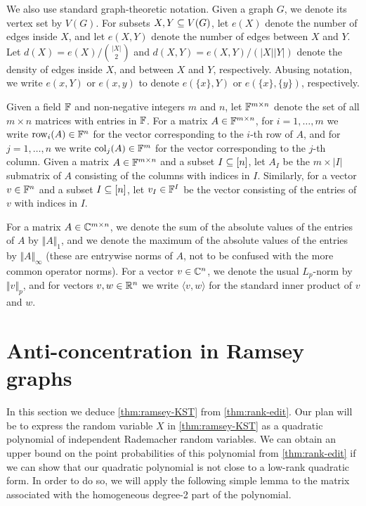 \documentclass{daj}
\theoremstyle{plain}
\theoremstyle{plain}
\theoremstyle{plain}
\theoremstyle{plain}
\theoremstyle{definition}
\theoremstyle{plain}
\theoremstyle{plain}
\theoremstyle{definition}
\theoremstyle{definition}
\theoremstyle{plain}
\begin{document}
We also use standard graph-theoretic notation. Given a graph $G$, we denote its vertex set by $V(G)$. For subsets $X,Y\subseteq V(G)$, let $e(X)$ denote the number of edges inside $X$, and let $e(X,Y)$ denote the number of edges between $X$ and $Y$. Let $d(X)=e(X)/\binom{|X|}{2}$ and $d(X,Y)=e(X,Y)/(|X||Y|)$ denote the density of edges inside $X$, and between $X$ and $Y$, respectively. Abusing notation, we write $e(x,Y)$ or $e(x,y)$ to denote $e(\{x\},Y)$ or $e(\{x\},\{y\})$, respectively.

Given a field $\mathbb{F}$ and non-negative integers $m$ and $n$, let $\mathbb{F}^{m\times n}$ denote the set of all $m\times n$ matrices with entries in $\mathbb{F}$. For a matrix $A\in \mathbb{F}^{m\times n}$, for $i=1,\dots,m$ we write $\operatorname{row}_i(A)\in \mathbb{F}^n$ for the vector corresponding to the $i$-th row of $A$, and for $j=1,\dots,n$ we write $\operatorname{col}_j(A)\in \mathbb{F}^m$ for the vector corresponding to the $j$-th column. Given a matrix $A\in \mathbb{F}^{m\times n}$ and a subset $I\subseteq [n]$, let $A_I$ be the $m\times |I|$ submatrix of $A$ consisting of the columns with indices in $I$.  Similarly, for a vector $v\in \mathbb{F}^n$ and a subset $I\subseteq [n]$, let $v_I\in \mathbb{F}^I$ be the vector consisting of the entries of $v$ with indices in $I$.

For a matrix $A\in \mathbb{C}^{m\times n}$, we denote the sum of the absolute values of the entries of $A$ by $\Vert A\Vert_1$, and we denote the maximum of the absolute values of the entries by $\Vert A\Vert_{\infty}$ (these are entrywise norms of $A$, not to be confused with the more common operator norms). For a vector $v\in \mathbb{C}^n$, we denote the usual $L_p$-norm by $\Vert v\Vert_p$, and for vectors $v,w\in \mathbb{R}^n$ we write $\langle v,w\rangle$ for the standard inner product of $v$ and $w$.

\section{Anti-concentration in Ramsey graphs\label{sec:ramsey}}

In this section we deduce \cref{thm:ramsey-KST} from \cref{thm:rank-edit}. Our plan will be to express the random variable $X$ in \cref{thm:ramsey-KST} as a quadratic polynomial of independent Rademacher random variables. We can obtain an upper bound on the point probabilities of this polynomial from \cref{thm:rank-edit} if we can show that our quadratic polynomial is not close to a low-rank quadratic form. In order to do so, we will apply the following simple lemma to the matrix associated with the homogeneous degree-2 part of the polynomial.
\end{document}
